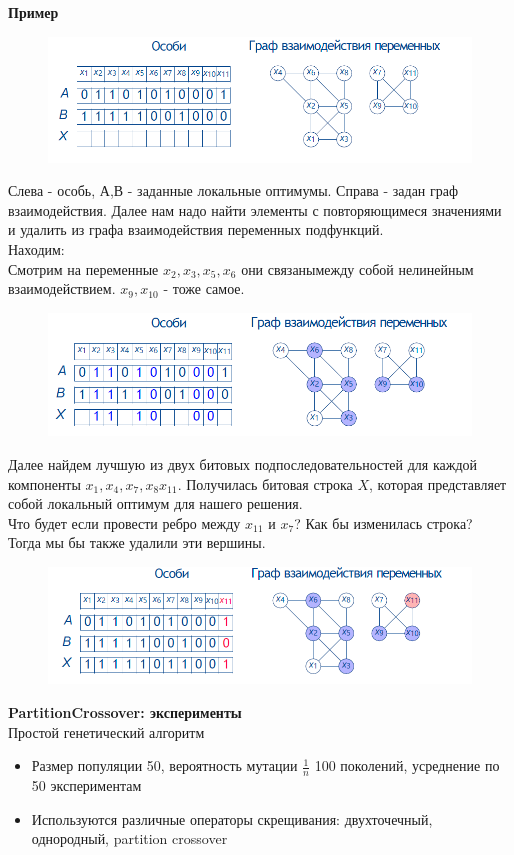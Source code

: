 \textbf{Пример}\\
\begin{figure}[H]
\centering
\includegraphics[width=0.8\linewidth]{images/pc1.PNG}
\end{figure}
Слева - особь, А,В - заданные локальные оптимумы. Справа - задан граф взаимодействия. Далее нам надо найти элементы с повторяющимеся значениями и удалить из графа взаимодействия переменных подфункций. \\
Находим:\\
Смотрим на переменные $x_2,x_3,x_5,x_6$ они связанымежду собой нелинейным взаимодействием. $x_9,x_{10}$ - тоже самое.\\
\begin{figure}[H]
\centering
\includegraphics[width=0.8\linewidth]{images/pc3.PNG}
\end{figure}
Далее найдем лучшую из двух битовых подпоследовательностей для каждой компоненты $x_1, x_4,x_7,x_8 x_{11}$. Получилась битовая строка $X$, которая представляет собой локальный оптимум для нашего решения.\\
Что будет если провести ребро между $x_{11}$ и $x_7$? Как бы изменилась строка? \\
Тогда мы бы также удалили эти вершины.\\
\begin{figure}[H]
\centering
\includegraphics[width=0.8\linewidth]{images/pc11.PNG}
\end{figure}

\textbf{PartitionCrossover: эксперименты}\\
Простой генетический алгоритм
\begin{itemize}
    \item Размер популяции 50, вероятность мутации $\frac{1}{n}$ 100 поколений, усреднение по 50 экспериментам
    \item Используются различные операторы скрещивания: двухточечный, однородный, partition crossover
\end{itemize}

